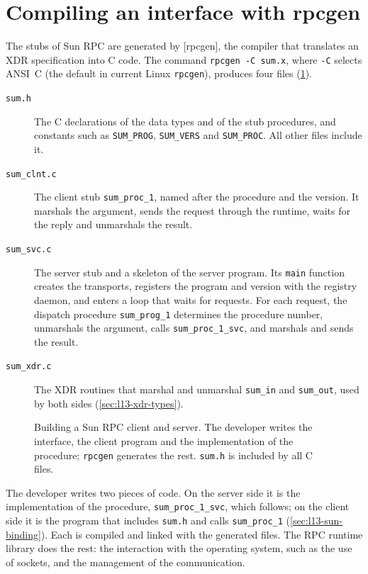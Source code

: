 \documentclass[../main.tex]{subfiles}
\begin{document}
\section{Compiling an interface with rpcgen}
\label{sec:l13-rpcgen}

The stubs of Sun RPC are generated by [rpcgen], the compiler
that translates an XDR specification into C code.  The command
\texttt{rpcgen -C sum.x}, where \texttt{-C} selects ANSI~C (the default in
current Linux \texttt{rpcgen}), produces four files (\cref{fig:l13-rpcgen}).
\begin{description}
  \item[\texttt{sum.h}] The C declarations of the data types and of the
    stub procedures, and constants such as \texttt{SUM\_PROG},
    \texttt{SUM\_VERS} and \texttt{SUM\_PROC}.  All other files include it.
  \item[\texttt{sum\_clnt.c}] The client stub \texttt{sum\_proc\_1}, named
    after the procedure and the version.  It marshals the argument, sends
    the request through the runtime, waits for the reply and unmarshals the
    result.
  \item[\texttt{sum\_svc.c}] The server stub and a skeleton of the server
    program.  Its \texttt{main} function creates the transports, registers
    the program and version with the registry daemon, and enters a loop
    that waits for requests.  For each request, the dispatch procedure
    \texttt{sum\_prog\_1} determines the procedure number, unmarshals the
    argument, calls \texttt{sum\_proc\_1\_svc}, and marshals and sends the
    result.
  \item[\texttt{sum\_xdr.c}] The XDR routines that marshal and unmarshal
    \texttt{sum\_in} and \texttt{sum\_out}, used by both sides
    (\cref{sec:l13-xdr-types}).
\end{description}

\begin{figure}[htbp]
  \centering
  
  \caption{Building a Sun RPC client and server.  The developer writes the
    interface, the client program and the implementation of the procedure;
    \texttt{rpcgen} generates the rest.  \texttt{sum.h} is included by all
    C files.}
  \label{fig:l13-rpcgen}
\end{figure}

The developer writes two pieces of code.  On the server side it is the
implementation of the procedure, \texttt{sum\_proc\_1\_svc}, which follows;
on the client side it is the program that includes \texttt{sum.h} and calls
\texttt{sum\_proc\_1} (\cref{sec:l13-sun-binding}).  Each is compiled and
linked with the generated files.  The RPC runtime library does the rest: the interaction
with the operating system, such as the use of sockets, and the management
of the communication.
\end{document}
